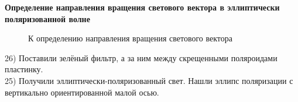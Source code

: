 \documentclass[a4paper,12pt]{article} %
\begin{document}
\textbf{Определение направления вращения светового вектора в эллиптически поляризованной волне}

\begin{figure}[H]  
	 \centering {}  
	\hspace{4ex}
	
	\caption{К определению направления вращения светового вектора} 
\end{figure}
 26) Поставили зелёный фильтр, а за ним между скрещенными поляроидами пластинку.\\
 25) Получили эллиптически-поляризованный свет. Нашли эллипс поляризации с вертикально ориентированной малой осью.
\end{document}
